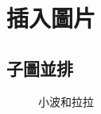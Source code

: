 \section{插入圖片}


\subsection{子圖並排}
\begin{figure}[H]
\centering  %
\qquad\qquad\qquad
{}
\caption{小波和拉拉}
\label{fig:小波和拉拉}
\end{figure}

